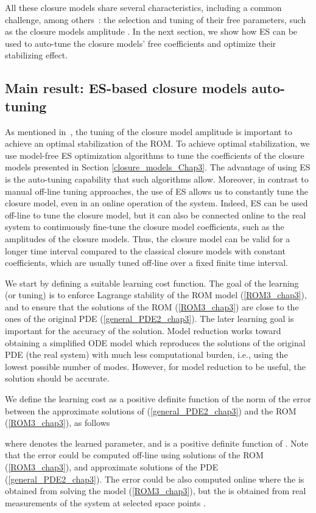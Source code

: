 \documentclass[letterpaper,conference,onecolumn,11pt]{IEEEtran}
\begin{document}
All these closure models share several characteristics, including a
common challenge, among others~\cite{CNTLDBDN13,SB14}: the selection
and tuning of their free parameters, such as the closure models
amplitude . In the next section, we show how ES can be used
to auto-tune the closure models' free coefficients and optimize their
stabilizing effect.


\subsection{Main result: ES-based closure models auto-tuning}
\label{MES-closure-tuning_chap3}
As mentioned in~\cite{SB14}, the tuning of the closure model amplitude
is important to achieve an optimal stabilization of the ROM. To
achieve optimal stabilization, we use model-free ES optimization
algorithms to tune the coefficients of the closure models presented in
Section \ref{closure_models_Chap3}. The advantage of using ES is the
auto-tuning capability that such algorithms allow. Moreover, in
contrast to manual off-line tuning approaches, the use of ES allows us
to constantly tune the closure model, even in an online operation of
the system. Indeed, ES can be used off-line to tune the closure model,
but it can also be connected online to the real system to continuously
fine-tune the closure model coefficients, such as the amplitudes of
the closure models. Thus, the closure model can be valid for a longer
time interval compared to the classical closure models with constant
coefficients, which are usually tuned off-line over a fixed finite
time interval.

We start by defining a suitable learning cost function. The goal of
the learning (or tuning) is to enforce Lagrange stability of the ROM
model (\ref{ROM3_chap3}), and to ensure that the solutions of the ROM
(\ref{ROM3_chap3}) are close to the ones of the original PDE
(\ref{general_PDE2_chap3}). The later learning goal is important for
the accuracy of the solution. Model reduction works toward obtaining a
simplified ODE model which reproduces the solutions of the original
PDE (the real system) with much less computational burden, i.e., using
the lowest possible number of modes. However, for model reduction to
be useful, the solution should be accurate.

We define the learning cost as a positive definite function of the
norm of the error between the approximate solutions of
(\ref{general_PDE2_chap3}) and the ROM (\ref{ROM3_chap3}), as follows

where  denotes the learned parameter, and
 is a positive definite function of . Note that the
error  could be computed off-line using solutions of the ROM
(\ref{ROM3_chap3}), and approximate solutions of the PDE
(\ref{general_PDE2_chap3}). The error could be also computed online
where the  is obtained from solving the
model (\ref{ROM3_chap3}), but the  is obtained from real
measurements of the system at selected space points .
\end{document}
